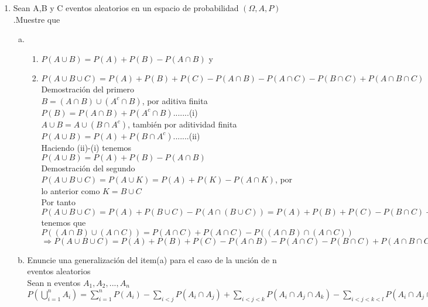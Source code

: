 \documentclass[12pt]{article}
\begin{document}
\maketitle
\begin{enumerate}

\item Sean A,B y C eventos aleatorios en un espacio de probabilidad $(\Omega, A , P)$.Muestre que
\begin{enumerate}[a)]
\item 
\begin{enumerate}[-]
\item
$P(A \cup B)= P(A)+P(B)-P(A \cap B)$    y \\
\item $P(A \cup B\cup C)=P(A)+P(B)+P(C)-P(A \cap B)-P(A\cap C)-P(B\cap C)+P(A\cap B\cap C)$ \\[0.2cm]
Demostración del primero\\
$B=(A\cap B)\cup (A^c \cap B)$, por aditiva finita\\
$P(B)=P(A\cap B)+ P(A^c \cap B)$.......(i)\\
$A \cup B = A \cup (B\cap A^c)$, también por aditividad finita\\
$P(A \cup B )= P(A) + P(B\cap A^c)$.......(ii)\\
Haciendo (ii)-(i) tenemos\\
$P(A \cup B)= P(A)+P(B)-P(A \cap B)$\\[0.2cm]
Demostración del segundo\\
$P(A \cup B\cup C)= P(A \cup K)= P(A)+P(K)-P(A\cap K)$, por lo anterior como $K=B\cup C$\\
Por tanto\\
$P(A \cup B\cup C)=P(A)+P(B \cup C)-P(A\cap (B\cup C))= P(A)+P(B)+P(C)-P(B\cap C)-P((A\cap B)\cup (A \cap C	))$\\
tenemos que $P((A\cap B)\cup (A \cap C	))= P(A\cap C)+P(A\cap C)-P((A\cap B)\cap(A\cap C))$\\
$\Rightarrow P(A \cup B\cup C)=P(A)+P(B)+P(C)-P(A \cap B)-P(A\cap C)-P(B\cap C)+P(A\cap B\cap C)$
\end{enumerate}
 
\item Enuncie una generalización del item(a) para el caso de la unción de n eventos aleatorios\\[0.2cm]
Sean n eventos $A_1,A_2,...,A_n$\\
$P(\displaystyle\bigcup_{i=1}^{n}A_i)= \displaystyle \sum_{i=1}^{n}P(A_i)-\displaystyle \sum_{i<j}P(A_i\cap A_j)+\displaystyle \sum_{i<j<k}P(A_i\cap A_j\cap A_k)-\displaystyle \sum_{i<j<k<l}P(A_i\cap A_j\cap A_k\cap A_l)+...+(-1)^{n+1}P(\displaystyle\bigcap_{i=1}^{n}A_i)   $


\end{enumerate}
\end{enumerate}
\end{document}
